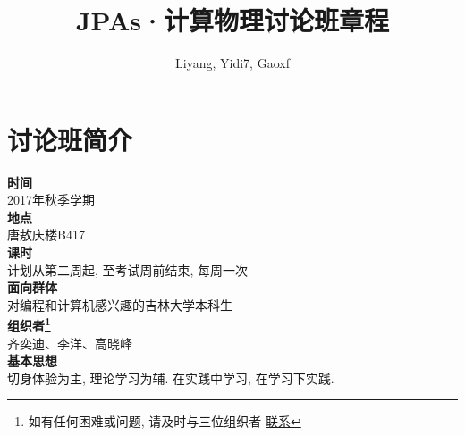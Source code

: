 \documentclass[10pt,a4paper, twocolumn]{article}
\title{\textbf{JPAs·计算物理讨论班章程}}
\author{Liyang, Yidi7, Gaoxf}
\begin{document}
  \maketitle

  \section{讨论班简介}
   \textbf{时间}\\2017年秋季学期\\
   \textbf{地点}\\唐敖庆楼B417\\
   \textbf{课时}\\计划从第二周起, 至考试周前结束, 每周一次\\
   \textbf{面向群体}\\对编程和计算机感兴趣的吉林大学本科生\\
   \textbf{组织者\footnote{如有任何困难或问题, 请及时与三位组织者
          \href{https://github.com/JLUComPhy/JLU_Computational_Physics/%
              blob/master/Organizer_info.md}{联系}}}\\齐奕迪、李洋、高晓峰\\
   \textbf{基本思想}\\切身体验为主, 理论学习为辅. 在实践中学习, 在学习下实践.
\end{document}
